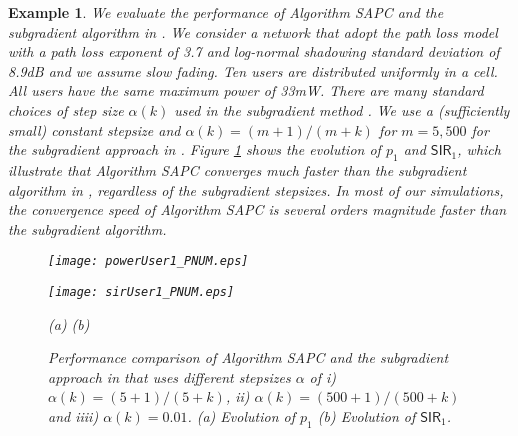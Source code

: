 \documentclass[10pt,twocolumn]{IEEEtran}
\newcommand{\0}{\mathbf{0}}
\newcommand{\1}{\mathbf{1}}
\newtheorem{example}{Example}
\begin{document}
\begin{example}
\label{numerical1}
We evaluate the performance of Algorithm SAPC and the subgradient algorithm in \cite{Chiang05}. We consider a network that adopt the path loss model with a path loss exponent of 3.7 and log-normal shadowing standard deviation of 8.9dB and we assume slow fading. Ten users are distributed uniformly in a cell. All users have the same maximum power of 33mW. There are many standard choices of step size $\alpha(k)$ used in the subgradient method \cite{Bertsekas99}. We use a (sufficiently small) constant stepsize and $\alpha(k)=(m+1)/(m+k)$ for $m=5,500$ \cite{Bertsekas99} for the subgradient approach in \cite{Chiang05}. Figure \ref{fig1} shows the evolution of $p_1$ and $\mathsf{SIR}_1$, which illustrate that Algorithm SAPC converges much faster than the subgradient algorithm in \cite{Chiang05}, regardless of the subgradient stepsizes. In most of our simulations, the convergence speed of Algorithm SAPC is several orders magnitude faster than the subgradient algorithm.

\begin{figure}
\begin{minipage}[t]{1.7in}
\begin{center}
\texttt{[image: powerUser1\_PNUM.eps]}
\end{center}
\end{minipage}
\begin{minipage}[t]{1.7in}
\begin{center}
\texttt{[image: sirUser1\_PNUM.eps]}
\end{center}
\end{minipage}
\begin{center}
(a) \hspace{1.5in} (b)
\end{center}
\caption{\scriptsize{Performance comparison of Algorithm SAPC and the subgradient approach in \cite{Chiang05} that uses different stepsizes $\alpha$ of i) $\alpha(k)=(5+1)/(5+k)$, ii) $\alpha(k)=(500+1)/(500+k)$ and iiii) $\alpha(k)=0.01$. (a) Evolution of $p_1$ (b) Evolution of $\mathsf{SIR}_1$. }} \label{fig1}
\end{figure}
\end{example}
\end{document}
